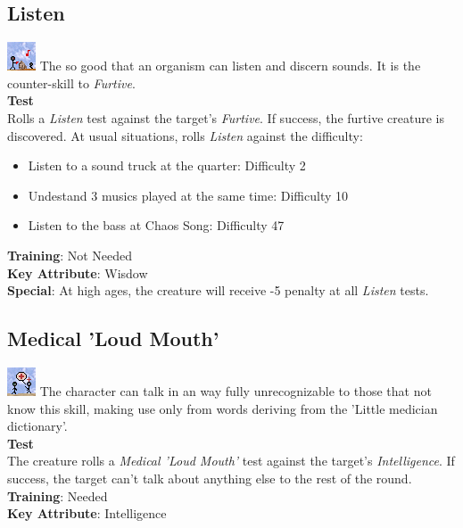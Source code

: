 \documentclass[ letterpaper,12pt]{article}
\begin{document}
\subsection{Listen}
\includegraphics{../data/skills/Img/ouvir.png}
The so good that an organism can listen and discern sounds. It is the counter-skill to {\it Furtive}.\\
{\bf Test}\\
Rolls a {\it Listen} test against the target's {\it Furtive}. If success, the furtive creature is discovered. At usual situations, rolls {\it Listen} against the difficulty:\\
\begin{itemize}
\item{Listen to a sound truck at the quarter: Difficulty 2}
\item{Undestand 3 musics played at the same time: Difficulty 10}
\item{Listen to the bass at Chaos Song: Difficulty 47}
\end{itemize}
{\bf Training}: Not Needed\\
{\bf Key Attribute}: Wisdow\\
{\bf Special}: At high ages, the creature will receive -5 penalty at all {\it Listen} tests.

\subsection{Medical 'Loud Mouth'}
\includegraphics{../data/skills/Img/tagarelice.png}
The character can talk in an way fully unrecognizable to those that not know this skill, making use only from words deriving from the 'Little medician dictionary'.\\
{\bf Test}\\
The creature rolls a {\it Medical 'Loud Mouth'} test against the target's {\it Intelligence}. If success, the target can't talk about anything else to the rest of the round.\\
{\bf Training}: Needed\\
{\bf Key Attribute}: Intelligence\\
\end{document}
